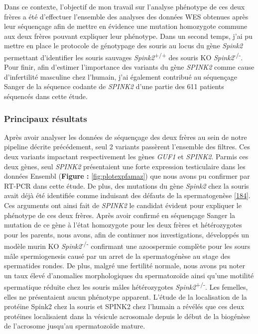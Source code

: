 \documentclass[12pt,twoside]{reedthesis}
\theoremstyle{definition}
\theoremstyle{definition}
\theoremstyle{remark}
\begin{document}
  Dans ce contexte, l'objectif de mon travail sur l'analyse phénotype de
  ces deux frères a été d'effectuer l'ensemble des analyses des données
  WES obtenues après leur séquençage afin de mettre en évidence une
  mutation homozygote commune aux deux frères pouvant expliquer leur
  phénotype. Dans un second temps, j'ai pu mettre en place le protocole de
  génotypage des souris au locus du gène \emph{Spink2} permettant
  d'identifier les souris sauvages \emph{Spink2}\textsuperscript{+/+} des
  souris KO \emph{Spink2}\textsuperscript{-/-}. Pour finir, afin d'estimer
  l'importance des variants du gène \emph{SPINK2} comme cause
  d'infertilité masculine chez l'humain, j'ai également contribué au
  séquençage Sanger de la séquence codante de \emph{SPINK2} d'une partie
  des 611 patients séquencés dans cette étude.
  
  \newpage
  
  
  
  \newpage
  
  \subsubsection{Principaux résultats}\label{principaux-resultats-2}
  
  Après avoir analyser les données de séquençage des deux frères au sein
  de notre pipeline décrite précédement, seul 2 variants passèrent
  l'ensemble des filtres. Ces deux variants impactant respectivement les
  gènes \emph{GUF1} et \emph{SPINK2}. Parmis ces deux gènes, seul
  \emph{SPINK2} présentaient une forte expression testiculaire dans les
  données Ensembl (\textbf{Figure : }\ref{fig:plotexpfamaz}) que nous
  avons pu confirmer par RT-PCR dans cette étude. De plus, des mutations
  du gène \emph{Spink2} chez la souris avait déjà été identifiée comme
  induisant des défauts de la spermatogenèse
  {[}\protect\hyperlink{ref-Lee2011}{184}{]}. Ces arguments ont ainsi fait
  de \emph{SPINK2} le candidat évident pour expliquer le phénotype de ces
  deux frères. Après avoir confirmé en séquençage Sanger la mutation de ce
  gène à l'état homozygote pour les deux frères et hétérozygotes pour les
  parents, nous avons, afin de continuer nos investigations, développés un
  modèle murin KO \emph{Spink2}\textsuperscript{-/-} confirmant une
  azoospermie complète pour les sours mâle spermiogenesis causé par un
  arret de la spermatogénèse au stage des spermatides rondes. De plus,
  malgré une fertilité normale, nous avons pu noter un taux élevé
  d'anomalies morphologiques du spermatozoïde ainsi qu'une motilité
  spermatique réduite chez les souris mâles hétérozygotes
  \emph{Spink2}\textsuperscript{+/-}. Les femelles, elles ne présentaient
  aucun phénotype apparent. L'étude de la localisation de la protéine
  Spink2 chez la souris et SPINK2 chez l'humain a révélés que ces deux
  protéines localisaient dans la vésicule acrosomale depuis le début de la
  biogénèse de l'acrosome jusqu'au spermatozoïde mature.
  
\end{document}
